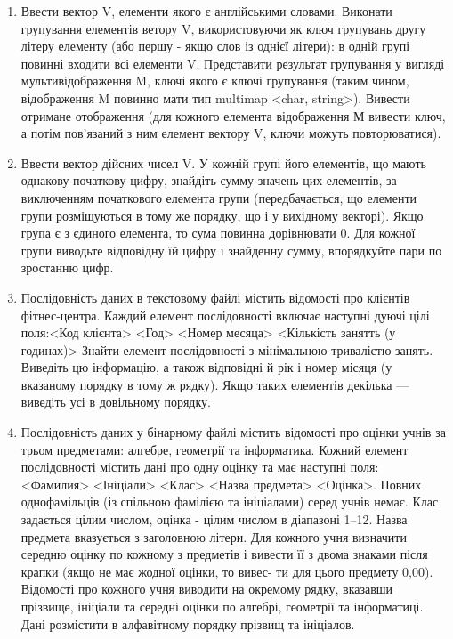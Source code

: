 \documentclass[a5paper,titlepage,openany,twoside,draft]{book_unv}%
\begin{document}
\begin{enumerate}
\item
Ввести вектор V, елементи якого є англійськими словами. 
Виконати групування елементів ветору V, використовуючи як ключ групувань 
другу літеру елементу (або першу - якщо слов із однієї літери):
в одній групі повинні входити всі елементи V. Представити результат групування
у вигляді мультивідображення M, ключі якого є ключі
групування (таким чином, відображення M повинно мати тип multimap <char, string>).
Вивести отримане отображення (для кожного елемента відображення
М вивести ключ, а потім пов'язаний з ним елемент вектору V,
 ключи можуть повторюватися).

\item
Ввести вектор дійсних чисел V. У кожній групі його елементів, що мають однакову початкову цифру,
 знайдіть сумму значень цих елементів, за виключенням початкового елемента групи (передбачається, що
елементи групи розміщуються в тому же порядку, що і у вихідному
векторі). Якщо група є з єдиного елемента, то сума
повинна дорівнювати 0. Для кожної групи виводьте відповідну
їй цифру і знайденну сумму, впорядкуйте пари по зростанню цифр. 

\item
Послідовність даних в текстовому файлі містить відомості про клієнтів
фітнес-центра. Каждий елемент послідовності включає наступні
дуючі цілі поля:<Код клієнта> <Год> <Номер месяца> <Кількість занятть (у годинах)>
Знайти елемент послідовності з мінімальною тривалістю занять.
 Виведіть цю інформацію, а також відповідні й рік і номер місяця 
(у вказаному порядку в тому ж рядку).
Якщо таких елементів декілька --- виведіть усі в довільному порядку.

\item
Послідовність даних у бінарному файлі містить відомості про оцінки
учнів за трьом предметами: алгебре, геометрії та інформатика.
Кожний елемент послідовності містить дані про одну
оцінку та має наступні поля:
<Фамилия> <Ініціали> <Клас> <Назва предмета> <Оцінка>. 
Повних однофамільців (із спільною фамілією та ініціалами)
серед учнів немає. Клас задається цілим числом, оцінка - цілим
числом в діапазоні 1–12. Назва предмета вказується з заголовною
літери. Для кожного учня визначити середню оцінку по кожному з предметів і
 вивести її з двома знаками після крапки (якщо не має жодної оцінки, то вивес-
ти для цього предмету 0,00). Відомості про кожного учня виводити
на окремому рядку, вказавши прізвище, ініціали та середні оцінки
по алгебрі, геометрії та інформатиці. Дані розмістити в алфавітному порядку
прізвищ та ініціалов. 


\end{enumerate}
\end{document}
